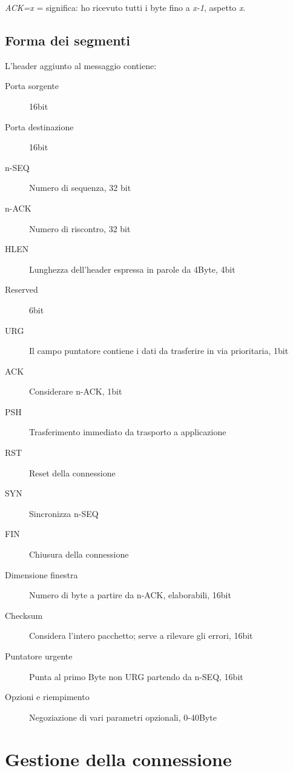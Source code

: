 \textit{ACK=x} = significa: ho ricevuto tutti i byte fino a \textit{x-1}, aspetto \textit{x}.
\subsection{Forma dei segmenti}
L'header aggiunto al messaggio contiene:
\begin{description}
    \item[Porta sorgente] 16bit
    \item[Porta destinazione] 16bit
    \item[n-SEQ] Numero di sequenza, 32 bit
    \item[n-ACK] Numero di riscontro, 32 bit
    \item[HLEN] Lunghezza dell'header espressa in parole da 4Byte, 4bit
    \item[Reserved] 6bit
    \item[URG] Il campo puntatore contiene i dati da trasferire in via prioritaria, 1bit
    \item[ACK] Considerare n-ACK, 1bit
    \item[PSH] Trasferimento immediato da trasporto a applicazione
    \item[RST] Reset della connessione
    \item[SYN] Sincronizza n-SEQ
    \item[FIN] Chiusura della connessione   
    \item[Dimensione finestra] Numero di byte {\tiny a partire da n-ACK}, elaborabili, 16bit
    \item[Checksum] Considera l'intero pacchetto; serve a rilevare gli errori, 16bit
    \item[Puntatore urgente] {\small Punta al primo Byte non URG partendo da n-SEQ}, 16bit
    \item[Opzioni e riempimento] {\small Negoziazione di vari parametri opzionali}, 0-40Byte
\end{description}
\newpage
\section{Gestione della connessione}
